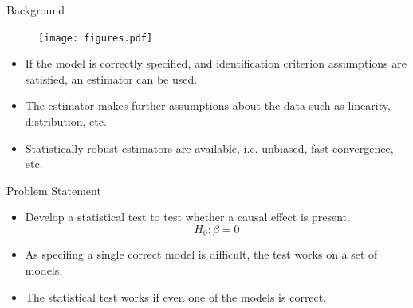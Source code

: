 \documentclass{beamer}
\begin{document}
\begin{frame}{Background}
	\begin{figure}
		\center
		\texttt{[image: figures.pdf]}
	\end{figure}
	\vspace{1em}
	\begin{itemize}
		\item If the model is correctly specified, and identification criterion assumptions are satisfied, an estimator can be used.
		\item The estimator makes further assumptions about the data such as linearity, distribution, etc.
		\item Statistically robust estimators are available, i.e. unbiased, fast convergence, etc.
	\end{itemize}
\end{frame}

\begin{frame}{Problem Statement}
	\begin{itemize}
		\item Develop a statistical test to test whether a causal effect is present. 
			$$ H_0: \beta = 0 $$
		\item As specifing a single correct model is difficult, the test works on a set of models.
		\item The statistical test works if even one of the models is correct.
	\end{itemize}
\end{frame}
\end{document}
